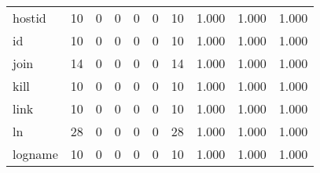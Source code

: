 \begin{longtable}{lp{1.3cm}p{1.3cm}p{1.3cm}p{1.3cm}p{1.3cm}p{1.3cm}p{1.3cm}p{1.3cm}p{1.3cm}}
hostid    &                     10 &                                             0 &                                            0 &                                           0 &                                            0 &                                         10 &                                1.000 &                                  1.000 &                                1.000 \\
id        &                     10 &                                             0 &                                            0 &                                           0 &                                            0 &                                         10 &                                1.000 &                                  1.000 &                                1.000 \\
join      &                     14 &                                             0 &                                            0 &                                           0 &                                            0 &                                         14 &                                1.000 &                                  1.000 &                                1.000 \\
kill      &                     10 &                                             0 &                                            0 &                                           0 &                                            0 &                                         10 &                                1.000 &                                  1.000 &                                1.000 \\
link      &                     10 &                                             0 &                                            0 &                                           0 &                                            0 &                                         10 &                                1.000 &                                  1.000 &                                1.000 \\
ln        &                     28 &                                             0 &                                            0 &                                           0 &                                            0 &                                         28 &                                1.000 &                                  1.000 &                                1.000 \\
logname   &                     10 &                                             0 &                                            0 &                                           0 &                                            0 &                                         10 &                                1.000 &                                  1.000 &                                1.000 \\

\end{longtable}
